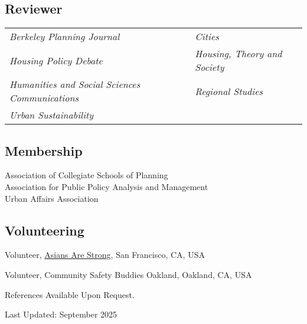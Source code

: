 \documentclass[11pt,letterpaper]{article}
\begin{document}
\subsection{Reviewer}
\begin{tabular}{@{}p{} p{}@{}}
\emph{Berkeley Planning Journal} & \emph{Cities}\\
\emph{Housing Policy Debate} & \emph{Housing, Theory and Society}\\
\emph{Humanities and Social Sciences Communications} & \emph{Regional Studies}\\
\emph{Urban Sustainability} &
\end{tabular}

\subsection{Membership}
Association of Collegiate Schools of Planning\\
Association for Public Policy Analysis and Management\\
Urban Affairs Association

\subsection{Volunteering}
\begin{tablist}
  \item[2024–2025] \tab{}Volunteer, \href{https://asiansarestrong.org/}{Asians Are Strong}, San Francisco, CA, USA
  \item[2024–2025] \tab{}Volunteer, Community Safety Buddies Oakland, Oakland, CA, USA
\end{tablist}

\vspace{1.0\baselineskip}
{\footnotesize References Available Upon Request.}\par\vspace{.2\baselineskip}
{\footnotesize Last Updated: September 2025}
\end{document}
